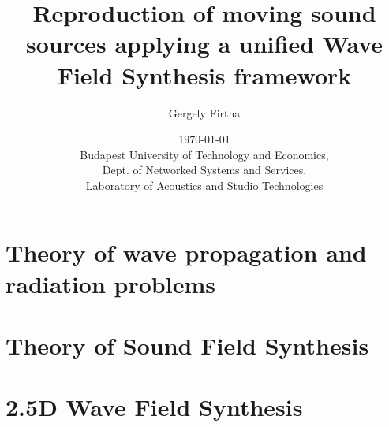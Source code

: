 \documentclass[12pt,a4paper]{report}
\title{Reproduction of moving sound sources applying a unified Wave Field Synthesis framework}
\date{\today \\
Budapest University of Technology and Economics, \\ Dept. of Networked Systems and Services, \\ Laboratory of Acoustics and Studio Technologies}
\author{Gergely Firtha}
\begin{document}

\maketitle
\tableofcontents
\printnomenclature
%
%
%
%
\chapter{Theory of wave propagation and radiation problems}
\label{sec:theory}


\chapter{Theory of Sound Field Synthesis}
\label{sec:SFS_theory}


\chapter{2.5D Wave Field Synthesis}
\label{sec:2_5D_WFS}


%




\end{document}
